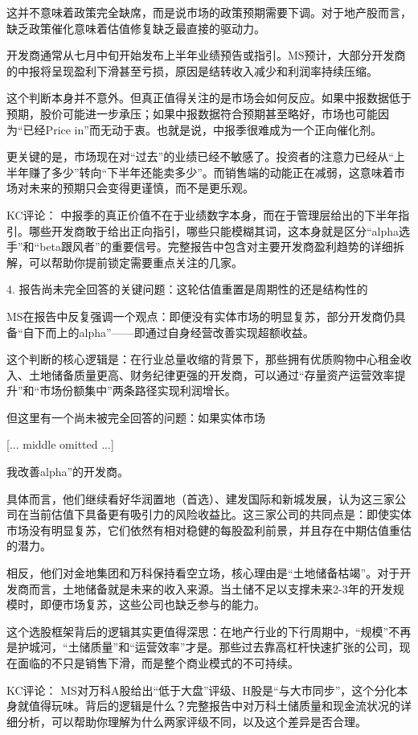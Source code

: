 \documentclass[11pt]{ctexart}
\begin{document}
这并不意味着政策完全缺席，而是说市场的政策预期需要下调。对于地产股而言，缺乏政策催化意味着估值修复缺乏最直接的驱动力。

开发商通常从七月中旬开始发布上半年业绩预告或指引。MS预计，大部分开发商的中报将呈现盈利下滑甚至亏损，原因是结转收入减少和利润率持续压缩。

这个判断本身并不意外。但真正值得关注的是市场会如何反应。如果中报数据低于预期，股价可能进一步承压；如果中报数据符合预期甚至略好，市场也可能因为“已经Price in”而无动于衷。也就是说，中报季很难成为一个正向催化剂。

更关键的是，市场现在对“过去”的业绩已经不敏感了。投资者的注意力已经从“上半年赚了多少”转向“下半年还能卖多少”。而销售端的动能正在减弱，这意味着市场对未来的预期只会变得更谨慎，而不是更乐观。

KC评论： 中报季的真正价值不在于业绩数字本身，而在于管理层给出的下半年指引。哪些开发商敢于给出正向指引，哪些只能模糊其词，这本身就是区分“alpha选手”和“beta跟风者”的重要信号。完整报告中包含对主要开发商盈利趋势的详细拆解，可以帮助你提前锁定需要重点关注的几家。

4. 报告尚未完全回答的关键问题：这轮估值重置是周期性的还是结构性的

MS在报告中反复强调一个观点：即便没有实体市场的明显复苏，部分开发商仍具备“自下而上的alpha”——即通过自身经营改善实现超额收益。

这个判断的核心逻辑是：在行业总量收缩的背景下，那些拥有优质购物中心租金收入、土地储备质量更高、财务纪律更强的开发商，可以通过“存量资产运营效率提升”和“市场份额集中”两条路径实现利润增长。

但这里有一个尚未被完全回答的问题：如果实体市场

[... middle omitted ...]

我改善alpha”的开发商。

具体而言，他们继续看好华润置地（首选）、建发国际和新城发展，认为这三家公司在当前估值下具备更有吸引力的风险收益比。这三家公司的共同点是：即使实体市场没有明显复苏，它们依然有相对稳健的每股盈利前景，并且存在中期估值重估的潜力。

相反，他们对金地集团和万科保持看空立场，核心理由是“土地储备枯竭”。对于开发商而言，土地储备就是未来的收入来源。当土储不足以支撑未来2-3年的开发规模时，即便市场复苏，这些公司也缺乏参与的能力。

这个选股框架背后的逻辑其实更值得深思：在地产行业的下行周期中，“规模”不再是护城河，“土储质量”和“运营效率”才是。那些过去靠高杠杆快速扩张的公司，现在面临的不只是销售下滑，而是整个商业模式的不可持续。

KC评论： MS对万科A股给出“低于大盘”评级、H股是“与大市同步”，这个分化本身就值得玩味。背后的逻辑是什么？完整报告中对万科土储质量和现金流状况的详细分析，可以帮助你理解为什么两家评级不同，以及这个差异是否合理。
\end{document}
